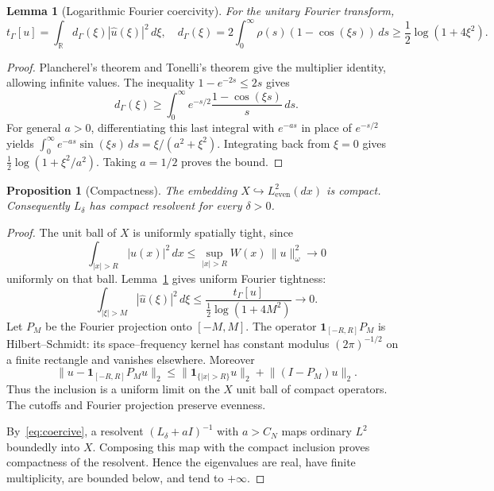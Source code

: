 \documentclass[11pt,a4paper]{article}
\numberwithin{equation}{section}
\newtheorem{proposition}[theorem]{Proposition}
\newtheorem{lemma}[theorem]{Lemma}
\theoremstyle{remark}
\newcommand{\R}{\mathbb R}
\newcommand{\Le}{L^2_{\mathrm{even}}(dx)}
\newcommand{\tg}{t_{\Gamma}}
\newcommand{\norm}[1]{\lVert #1\rVert}
\newcommand{\one}{\mathbf 1}
\begin{document}
\begin{lemma}[Logarithmic Fourier coercivity]\label{lem:fourier}
For the unitary Fourier transform,
\begin{equation}\label{eq:multiplier}
 \tg[u]=\int_\R d_\Gamma(\xi)|\widehat u(\xi)|^2\,d\xi,
 \quad
 d_\Gamma(\xi)=2\int_0^\infty\rho(s)(1-\cos(\xi s))\,ds
 \ge\frac12\log(1+4\xi^2).
\end{equation}
\end{lemma}
\begin{proof}
Plancherel's theorem and Tonelli's theorem give the multiplier identity, allowing infinite values. The inequality $1-e^{-2s}\le2s$ gives
\[
 d_\Gamma(\xi)\ge\int_0^\infty e^{-s/2}\frac{1-\cos(\xi s)}s\,ds.
\]
For general $a>0$, differentiating this last integral with $e^{-as}$ in place of $e^{-s/2}$ yields $\int_0^\infty e^{-as}\sin(\xi s)\,ds=\xi/(a^2+\xi^2)$. Integrating back from $\xi=0$ gives $\tfrac12\log(1+\xi^2/a^2)$. Taking $a=1/2$ proves the bound.
\end{proof}

\begin{proposition}[Compactness]\label{prop:compact}
The embedding $X\hookrightarrow\Le$ is compact. Consequently $L_\delta$ has compact resolvent for every $\delta>0$.
\end{proposition}
\begin{proof}
The unit ball of $X$ is uniformly spatially tight, since
\begin{equation}\label{eq:spatialtight}
 \int_{|x|>R}|u(x)|^2\,dx
 \le\sup_{|x|>R}W(x)\,\norm{u}_\omega^2\longrightarrow0
\end{equation}
uniformly on that ball. Lemma~\ref{lem:fourier} gives uniform Fourier tightness:
\begin{equation}\label{eq:fouriertight}
 \int_{|\xi|>M}|\widehat u(\xi)|^2\,d\xi
 \le\frac{\tg[u]}{\tfrac12\log(1+4M^2)}\longrightarrow0.
\end{equation}
Let $P_M$ be the Fourier projection onto $[-M,M]$. The operator
$\one_{[-R,R]}P_M$ is Hilbert--Schmidt: its space--frequency kernel has constant modulus $(2\pi)^{-1/2}$ on a finite rectangle and vanishes elsewhere. Moreover
\[
 \norm{u-\one_{[-R,R]}P_Mu}_2
 \le\norm{\one_{\{|x|>R\}}u}_2+\norm{(I-P_M)u}_2.
\]
Thus the inclusion is a uniform limit on the $X$ unit ball of compact operators. The cutoffs and Fourier projection preserve evenness.

By~\eqref{eq:coercive}, a resolvent $(L_\delta+aI)^{-1}$ with $a>C_N$ maps ordinary $L^2$ boundedly into $X$. Composing this map with the compact inclusion proves compactness of the resolvent. Hence the eigenvalues are real, have finite multiplicity, are bounded below, and tend to $+\infty$.
\end{proof}
\end{document}
